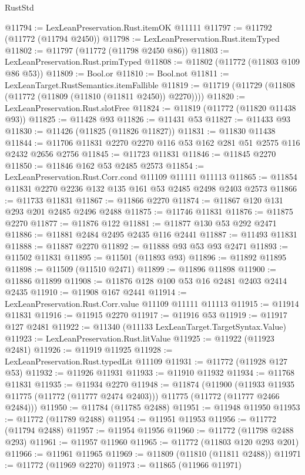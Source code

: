 \begin{lexlean}{RustStd}
\begin{coremodule}
@11794 := LexLeanPreservation.Rust.itemOK @11111
@11797 := @11792 (@11772 (@11794 @2450))
@11798 := LexLeanPreservation.Rust.itemTyped
@11802 := @11797 (@11772 (@11798 @2450 @86))
@11803 := LexLeanPreservation.Rust.primTyped
@11808 := @11802 (@11772 (@11803 @109 @86 @53))
@11809 := Bool.or
@11810 := Bool.not
@11811 := LexLeanTarget.RustSemantics.itemFallible
@11819 := @11719 (@11729 (@11808 (@11772 (@11809 (@11810 (@11811 @2450)) @2270))))
@11820 := LexLeanPreservation.Rust.slotFree
@11824 := @11819 (@11772 (@11820 @11438 @93))
@11825 := @11428 @93
@11826 := @11431 @53
@11827 := @11433 @93
@11830 := @11426 (@11825 (@11826 @11827))
@11831 := @11830 @11438
@11844 := @11706 @11831 @2270 @2270 @116 @53 @162 @281 @51 @2575 @116 @2432 @2656 @2756
@11845 := @11723 @11831
@11846 := @11845 @2270
@11850 := @11846 @162 @53 @2485 @2573
@11854 := LexLeanPreservation.Rust.Corr.cond @11109 @11111 @11113
@11865 := @11854 @11831 @2270 @2236 @132 @135 @161 @53 @2485 @2498 @2403 @2573
@11866 := @11733 @11831
@11867 := @11866 @2270
@11874 := @11867 @120 @131 @293 @201 @2485 @2496 @2488
@11875 := @11746 @11831
@11876 := @11875 @2270
@11877 := @11876 @122
@11881 := @11877 @130 @53 @292 @2471
@11886 := @11881 @2484 @2495 @2435 @116 @2441
@11887 := @11493 @11831
@11888 := @11887 @2270
@11892 := @11888 @93 @53 @93 @2471
@11893 := @11502 @11831
@11895 := @11501 (@11893 @93)
@11896 := @11892 @11895
@11898 := @11509 (@11510 @2471)
@11899 := @11896 @11898
@11900 := @11886 @11899
@11908 := @11876 @128 @100 @53 @16 @2481 @2403 @2414 @2435
@11910 := @11908 @167 @2441
@11914 := LexLeanPreservation.Rust.Corr.value @11109 @11111 @11113
@11915 := @11914 @11831
@11916 := @11915 @2270
@11917 := @11916 @53
@11919 := @11917 @127 @2481
@11922 := @11340 (@11133 LexLeanTarget.TargetSyntax.Value)
@11923 := LexLeanPreservation.Rust.litValue
@11925 := @11922 (@11923 @2481)
@11926 := @11919 @11925
@11928 := LexLeanPreservation.Rust.typedLit @11109
@11931 := @11772 (@11928 @127 @53)
@11932 := @11926 @11931
@11933 := @11910 @11932
@11934 := @11768 @11831
@11935 := @11934 @2270
@11948 := @11874
    (@11900
      (@11933 @11935 @11775 (@11772 (@11777 @2474 @2403)))
      @11775
      (@11772 (@11777 @2466 @2484)))
@11950 := @11784 (@11785 @2488)
@11951 := @11948 @11950
@11953 := @11772 (@11789 @2488)
@11954 := @11951 @11953
@11956 := @11772 (@11794 @2488)
@11957 := @11954 @11956
@11960 := @11772 (@11798 @2488 @293)
@11961 := @11957 @11960
@11965 := @11772 (@11803 @120 @293 @201)
@11966 := @11961 @11965
@11969 := @11809 (@11810 (@11811 @2488))
@11971 := @11772 (@11969 @2270)
@11973 := @11865 (@11966 @11971)

\end{coremodule}
\end{lexlean}
